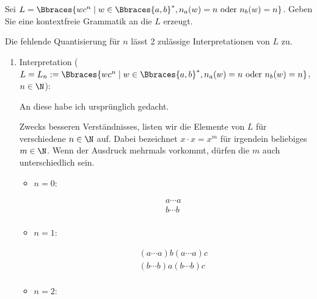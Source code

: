 
\begin{exercise}

Sei $L = \Bbraces{w c^n \mid w \in \Bbraces{a, b}^\ast, n_a(w) = n ~\text{oder}~ n_b(w) = n}$.
Geben Sie eine kontextfreie Grammatik an die $L$ erzeugt.

\end{exercise}


\begin{solution}

Die fehlende Quantisierung für $n$ lässt 2 zulässige Interpretationen von $L$ zu.

\begin{enumerate}

    \item Interpretation ($L = L_n := \Bbraces{w c^n \mid w \in \Bbraces{a, b}^\ast, n_a(w) = n ~\text{oder}~ n_b(w) = n}$, $n \in \N$):
    
    An diese habe ich ursprünglich gedacht.

    Zwecks besseren Verständnisses, listen wir die Elemente von $L$ für verschiedene $n \in \N$ auf.
    Dabei bezeichnet $x \cdot x = x^m$ für irgendein beliebiges $m \in \N$.
    Wenn der Ausdruck mehrmals vorkommt, dürfen die $m$ auch unterschiedlich sein.
    
    \begin{itemize}
    
        \item $n = 0$:
        
        \begin{align*}
            a \cdots a \\
            b \cdots b \\
        \end{align*}
    
        \item $n = 1$:
        
        \begin{align*}
            (a \cdots a) b (a \cdots a) c \\
            (b \cdots b) a (b \cdots b) c \\
        \end{align*}
    
        \item $n = 2$:
        

\end{itemize}
\end{enumerate}
\end{solution}
